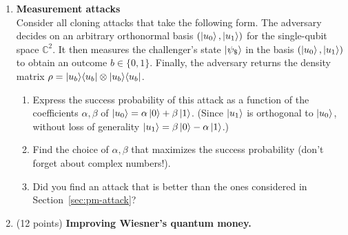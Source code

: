 \documentclass[12pt]{article}
\begin{document}
\begin{enumerate}
\item {\bf Measurement attacks}\\
Consider all cloning attacks that take the following form. The adversary decides on an arbitrary orthonormal basis $(\ket{u_0},\ket{u_1})$ for the single-qubit space $\mathbb{C}^2$. It then measures the challenger's state $\ket{\psi_\$}$ in the basis $(\ket{u_0},\ket{u_1})$ to obtain an outcome $b\in\{0,1\}$. Finally, the adversary returns the density matrix $\rho = \ket{u_b}\!\bra{u_b}\otimes \ket{u_b}\!\bra{u_b}$. 
\begin{enumerate}
\item Express the success probability of this attack as a function of the coefficients $\alpha,\beta$ of $\ket{u_0} = \alpha \ket{0} + \beta\ket{1}$. (Since $\ket{u_1}$ is orthogonal to $\ket{u_0}$, without loss of generality $\ket{u_1} = \beta\ket{0} - \alpha \ket{1}$.) 
\item Find the choice of $\alpha,\beta$ that maximizes the success probability (don't forget about complex numbers!). 
\item Did you find an attack that is better than the ones considered in Section~\ref{sec:pm-attack}? 
\end{enumerate}



\item (12 points) {\bf Improving Wiesner's quantum money.}


\end{enumerate}
\end{document}
